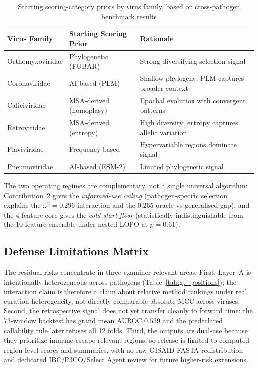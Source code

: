 \begin{table}[htbp]
\centering
\caption{Starting scoring-category priors by virus family, based on cross-pathogen benchmark results}
\label{tab:scoring_recommendation}
\small
\begin{tabularx}{\textwidth}{llX}
\toprule
\textbf{Virus Family} & \textbf{Starting Scoring Prior} & \textbf{Rationale} \\
\midrule
Orthomyxoviridae & Phylogenetic (FUBAR) & Strong diversifying selection signal \\
Coronaviridae    & AI-based (PLM)       & Shallow phylogeny; PLM captures broader context \\
Caliciviridae    & MSA-derived (homoplasy) & Epochal evolution with convergent patterns \\
Retroviridae     & MSA-derived (entropy)   & High diversity; entropy captures allelic variation \\
Flaviviridae     & Frequency-based         & Hypervariable regions dominate signal \\
Pneumoviridae    & AI-based (ESM-2)        & Limited phylogenetic signal \\
\bottomrule
\end{tabularx}
\end{table}

The two operating regimes are complementary, not a single universal algorithm: Contribution~2 gives the \emph{informed-use ceiling} (pathogen-specific selection explains the $\omega^2 = 0.296$ interaction and the $0.265$ oracle-vs-generalised gap), and the 4-feature core gives the \emph{cold-start floor} (statistically indistinguishable from the 10-feature ensemble under nested-LOPO at $p = 0.61$).

\subsection{Defense Limitations Matrix}
\label{sec:phylo_limits}
\label{sec:esm2_leakage}
\label{sec:scoring_input_heterogeneity}
\label{sec:gt_heterogeneity}
\label{para:sublineage_pooling}
\label{para:hbv_pilot}
\label{sec:plm_data_limitations}
\label{sec:prospective_validation_gap}
\label{sec:durc_ethics}
\label{sec:mafft_auto_artifact}
\label{sec:limitations}

The residual risks concentrate in three examiner-relevant areas. First, Layer~A is intentionally heterogeneous across pathogens (Table~\ref{tab:gt_positions}); the interaction claim is therefore a claim about relative method rankings under real curation heterogeneity, not directly comparable absolute MCC across viruses. Second, the retrospective signal does not yet transfer cleanly to forward time: the 73-window backtest has grand mean AUROC $0.539$ and the predeclared callability rule later refuses all 12 folds. Third, the outputs are dual-use because they prioritize immune-escape-relevant regions, so release is limited to computed region-level scores and summaries, with no raw GISAID FASTA redistribution and dedicated IBC/P3CO/Select Agent review for future higher-risk extensions.

